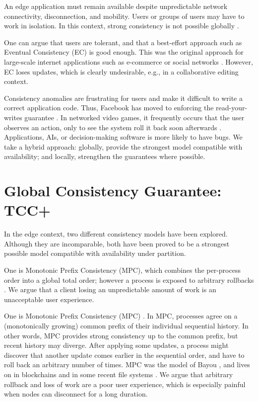 An edge application must remain available despite unpredictable network
connectivity, disconnection, and mobility.
Users or groups of users may have to work in isolation.
In this context, strong consistency is not possible globally
\cite{rep:pan:1628}.
  
One can argue that users are tolerant, and that a best-effort approach
such as Eventual Consistency (EC) is good enough.
This was the original approach for large-scale internet applications
such as e-commerce or social networks \cite{rep:syn:pan:1624}.
However, EC loses updates, which is clearly undesirable, e.g., in a
collaborative editing context.
  
Consistency anomalies are frustrating for users and make it difficult to write
a correct application code.
Thus, Facebook has moved to enforcing the read-your-writes guarantee
\cite{syn:1840}.
In networked video games, it frequently occurs that the user observes
an action, only to see the system roll it back soon afterwards
\cite{app:rep:1839}.
Applications, AIs, or decision-making software is more likely to have
bugs.
We take a hybrid approach: globally, provide the strongest model
compatible with availability; and locally, strengthen the guarantees
where possible.

\section{Global Consistency Guarantee: TCC+}
\label{sec:glob-cons-guar}

In the edge context, two different consistency models have been
explored.
Although they are incomparable, both have been proved to be a
strongest possible model compatible with availability under partition.

One is Monotonic Prefix Consistency (MPC), which combines the
per-process order into a global total order; however a process is
exposed to arbitrary rollbacks \cite{formel:syn:1806}.
We argue that a client losing an unpredictable amount of work is
an unacceptable user experience.

One is Monotonic Prefix Consistency (MPC) \cite{formel:syn:1806}.
In MPC, processes agree on a (monotonically growing) common prefix of
their individual sequential history.
In other words, MPC provides strong consistency up to the common
prefix, but recent history may diverge.
After applying some updates, a process might discover that another
update comes earlier in the sequential order, and have to roll back an
arbitrary number of times. MPC was the model of Bayou
\cite{syn:optim:rep:1433}, and lives on in blockchains
\cite{pass2017analysis, garay2015bitcoin} and in some recent file
systems \cite{syn:app:rep:1841}.
We argue that arbitrary rollback and loss of work are a poor user
experience, which is especially painful when nodes can disconnect for a
long duration.

